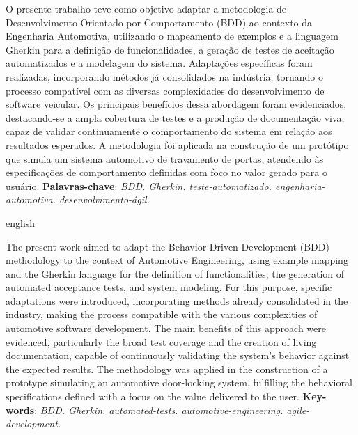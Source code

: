 \setlength{\absparsep}{18pt} %
\begin{resumo}

	O presente trabalho teve como objetivo adaptar a metodologia de Desenvolvimento Orientado por Comportamento (BDD) ao contexto da Engenharia Automotiva, utilizando o 
	mapeamento de exemplos e a linguagem Gherkin para a definição de funcionalidades, a geração de testes de aceitação automatizados e a modelagem do sistema. Adaptações 
	específicas foram realizadas, incorporando métodos já consolidados na indústria, tornando o processo compatível com as diversas complexidades do desenvolvimento de 
	software veicular. Os principais benefícios dessa abordagem foram evidenciados, destacando-se a ampla cobertura de testes e a produção de documentação viva, capaz 
	de validar continuamente o comportamento do sistema em relação aos resultados esperados. A metodologia foi aplicada na construção de um protótipo que simula um sistema 
	automotivo de travamento de portas, atendendo às especificações de comportamento definidas com foco no valor gerado para o usuário.	
	\vspace{\onelineskip}
    \noindent
	\textbf{Palavras-chave}: \textit{BDD. Gherkin. teste-automatizado. engenharia-automotiva. desenvolvimento-ágil.}

\end{resumo}

\begin{resumo}[Abstract]
\begin{otherlanguage*}{english}

	The present work aimed to adapt the Behavior-Driven Development (BDD) methodology to the context of Automotive Engineering, using example mapping and the Gherkin 
	language for the definition of functionalities, the generation of automated acceptance tests, and system modeling. For this purpose, specific adaptations were 
	introduced, incorporating methods already consolidated in the industry, making the process compatible with the various complexities of automotive software 
	development. The main benefits of this approach were evidenced, particularly the broad test coverage and the creation of living documentation, capable of 
	continuously validating the system's behavior against the expected results. The methodology was applied in the construction of a prototype simulating an 
	automotive door-locking system, fulfilling the behavioral specifications defined with a focus on the value delivered to the user.	
	\vspace{\onelineskip}
	\noindent
	\textbf{Key-words}: \textit{BDD. Gherkin. automated-tests. automotive-engineering. agile-development.}

\end{otherlanguage*}
\end{resumo}



